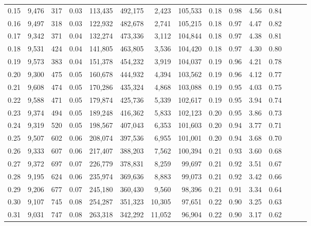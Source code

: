 \begin{tabular}{rrrrrrrrrrrrrrr}
0.15 &  9,476 &    317 &  0.03 &  113,435 &  492,175 &    2,423 &  105,533 &  0.18 &  0.98 &  4.56 &      0.84 \\
0.16 &  9,497 &    318 &  0.03 &  122,932 &  482,678 &    2,741 &  105,215 &  0.18 &  0.97 &  4.47 &      0.82 \\
0.17 &  9,342 &    371 &  0.04 &  132,274 &  473,336 &    3,112 &  104,844 &  0.18 &  0.97 &  4.38 &      0.81 \\
0.18 &  9,531 &    424 &  0.04 &  141,805 &  463,805 &    3,536 &  104,420 &  0.18 &  0.97 &  4.30 &      0.80 \\
0.19 &  9,573 &    383 &  0.04 &  151,378 &  454,232 &    3,919 &  104,037 &  0.19 &  0.96 &  4.21 &      0.78 \\
0.20 &  9,300 &    475 &  0.05 &  160,678 &  444,932 &    4,394 &  103,562 &  0.19 &  0.96 &  4.12 &      0.77 \\
0.21 &  9,608 &    474 &  0.05 &  170,286 &  435,324 &    4,868 &  103,088 &  0.19 &  0.95 &  4.03 &      0.75 \\
0.22 &  9,588 &    471 &  0.05 &  179,874 &  425,736 &    5,339 &  102,617 &  0.19 &  0.95 &  3.94 &      0.74 \\
0.23 &  9,374 &    494 &  0.05 &  189,248 &  416,362 &    5,833 &  102,123 &  0.20 &  0.95 &  3.86 &      0.73 \\
0.24 &  9,319 &    520 &  0.05 &  198,567 &  407,043 &    6,353 &  101,603 &  0.20 &  0.94 &  3.77 &      0.71 \\
0.25 &  9,507 &    602 &  0.06 &  208,074 &  397,536 &    6,955 &  101,001 &  0.20 &  0.94 &  3.68 &      0.70 \\
0.26 &  9,333 &    607 &  0.06 &  217,407 &  388,203 &    7,562 &  100,394 &  0.21 &  0.93 &  3.60 &      0.68 \\
0.27 &  9,372 &    697 &  0.07 &  226,779 &  378,831 &    8,259 &   99,697 &  0.21 &  0.92 &  3.51 &      0.67 \\
0.28 &  9,195 &    624 &  0.06 &  235,974 &  369,636 &    8,883 &   99,073 &  0.21 &  0.92 &  3.42 &      0.66 \\
0.29 &  9,206 &    677 &  0.07 &  245,180 &  360,430 &    9,560 &   98,396 &  0.21 &  0.91 &  3.34 &      0.64 \\
0.30 &  9,107 &    745 &  0.08 &  254,287 &  351,323 &   10,305 &   97,651 &  0.22 &  0.90 &  3.25 &      0.63 \\
0.31 &  9,031 &    747 &  0.08 &  263,318 &  342,292 &   11,052 &   96,904 &  0.22 &  0.90 &  3.17 &      0.62 \\

\end{tabular}
